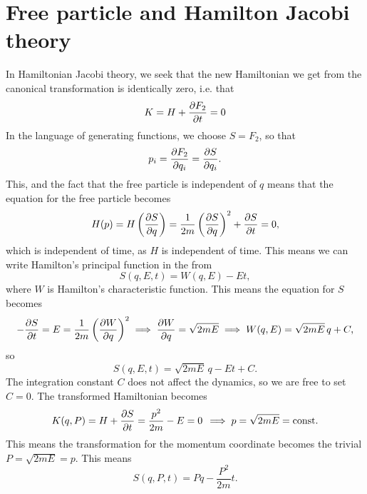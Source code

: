 \documentclass{article}
\begin{document}
    \section{Free particle and Hamilton Jacobi theory}
        In Hamiltonian Jacobi theory, we seek that the new Hamiltonian we get from the canonical transformation is identically zero, i.e. that
        \begin{equation*}
            K = H + \pdv{F_2}{t} = 0
        \end{equation*} 
        In the language of generating functions, we choose $S = F_2$, so that
        \begin{equation*}
            p_i = \pdv{F_2}{q_i} = \pdv{S}{q_i}. 
        \end{equation*}
        This, and the fact that the free particle is independent of $q$ means that the equation for the free particle becomes
        \begin{equation*}
            H(p) = H\left(\pdv{S}{q}\right) = \frac{1}{2m} \left(\pdv{S}{q}\right)^2 + \pdv{S}{t} = 0,
        \end{equation*}
        which is independent of time, as $H$ is independent of time. This means we can write Hamilton's principal function in the from
        \begin{equation*}
            S(q, E, t) = W(q, E) - Et,
        \end{equation*}
        where $W$ is Hamilton's characteristic function. This means the equation for $S$ becomes
        \begin{equation*}
            -\pdv{S}{t} = E = \frac{1}{2m} \left(\pdv{W}{q}\right)^2 \implies \pdv{W}{q} = \sqrt{2 m E} \implies W(q, E) = \sqrt{2mE} \, q + C,
        \end{equation*}
        so
        \begin{equation*}
            S(q, E, t) = \sqrt{2mE} \, q - Et + C.
        \end{equation*}
        The integration constant $C$ does not affect the dynamics, so we are free to set $C=0$. The transformed Hamiltonian becomes
        \begin{equation*}
            K(q, P) = H + \pdv{S}{t} = \frac{p^2}{2m} - E = 0 \, \implies p = \sqrt{2mE} = \mathrm{const.}
        \end{equation*}
        This means the transformation for the momentum coordinate becomes the trivial $P = \sqrt{2mE} = p$. This means
        \begin{equation*}
            S(q, P, t) = P q - \frac{P^2}{2m} t.
        \end{equation*}
\end{document}
